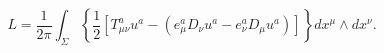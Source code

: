 \begin{equation}
L=\frac{1}{2\pi }\int_\Sigma \left\{ \frac{1}{2}\left[ T_{\mu \nu
}^au^a-\left( e_\mu ^aD_\nu u^a-e_\nu ^aD_\mu u^a\right) \right]
\right\} dx^\mu \wedge dx^\nu . \label{fc1}
\end{equation}

